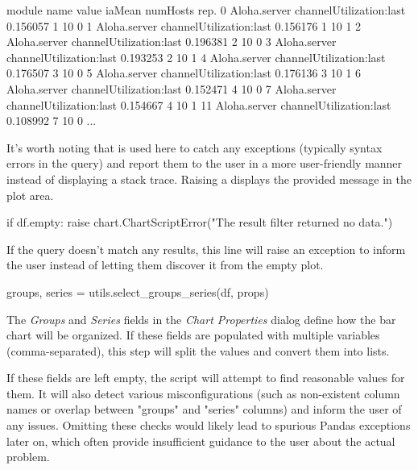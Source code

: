 \begin{commandline}
          module                     name     value iaMean numHosts rep.
0   Aloha.server  channelUtilization:last  0.156057      1       10    0
1   Aloha.server  channelUtilization:last  0.156176      1       10    1
2   Aloha.server  channelUtilization:last  0.196381      2       10    0
3   Aloha.server  channelUtilization:last  0.193253      2       10    1
4   Aloha.server  channelUtilization:last  0.176507      3       10    0
5   Aloha.server  channelUtilization:last  0.176136      3       10    1
6   Aloha.server  channelUtilization:last  0.152471      4       10    0
7   Aloha.server  channelUtilization:last  0.154667      4       10    1
11  Aloha.server  channelUtilization:last  0.108992      7       10    0
...
\end{commandline}

It's worth noting that  is used here to catch any exceptions
(typically syntax errors in the query) and report them to the user in a more
user-friendly manner instead of displaying a stack trace. Raising a
 displays the provided message in the plot area.

\begin{python}
if df.empty:
    raise chart.ChartScriptError("The result filter returned no data.")
\end{python}

If the query doesn't match any results, this line will raise an exception
to inform the user instead of letting them discover it from the empty plot.

\begin{python}
groups, series = utils.select_groups_series(df, props)
\end{python}

The \textit{Groups} and \textit{Series} fields in the \textit{Chart Properties}
dialog define how the bar chart will be organized. If these fields are populated
with multiple variables (comma-separated), this step will split the values and
convert them into lists.

If these fields are left empty, the script will attempt to find reasonable
values for them. It will also detect various misconfigurations (such as
non-existent column names or overlap between "groups" and "series" columns) and
inform the user of any issues. Omitting these checks would likely lead to
spurious Pandas exceptions later on, which often provide insufficient guidance
to the user about the actual problem.

